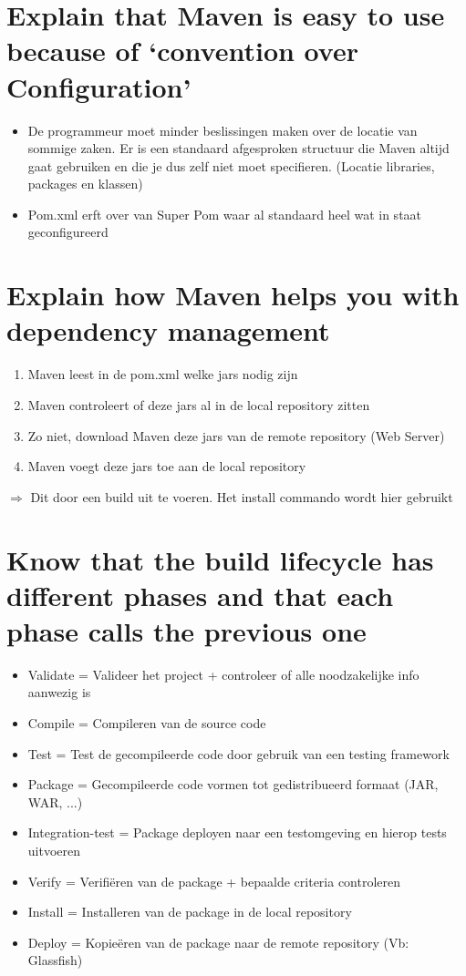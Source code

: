 \section{Explain that Maven is easy to use because of ‘convention over Configuration’}

\begin{itemize}
	\item De programmeur moet minder beslissingen maken over de locatie van sommige zaken. Er is een standaard afgesproken structuur die Maven altijd gaat gebruiken en die je dus zelf niet moet specifieren. (Locatie libraries, packages en klassen)
	\item Pom.xml erft over van Super Pom waar al standaard heel wat in staat geconfigureerd
\end{itemize}

\section{Explain how Maven helps you with dependency management}
\begin{enumerate}
	\item Maven leest in de pom.xml welke jars nodig zijn
	\item Maven controleert of deze jars al in de local repository zitten
	\item Zo niet, download Maven deze jars van de remote repository (Web Server)
	\item Maven voegt deze jars toe aan de local repository
\end{enumerate}

$\Rightarrow$ Dit door een build uit te voeren. Het install commando wordt hier gebruikt

\section{Know that the build lifecycle has different phases and that each phase calls the previous one}

\begin{itemize}
	\item Validate = Valideer het project + controleer of alle noodzakelijke info aanwezig is
	\item Compile = Compileren van de source code
		\item Test = Test de gecompileerde code door gebruik van een testing framework
	\item Package =  Gecompileerde code vormen tot gedistribueerd formaat (JAR, WAR, ...)
		\item Integration-test = Package deployen naar een testomgeving en hierop tests uitvoeren
	\item Verify = Verifiëren van de package + bepaalde criteria controleren
		\item Install = Installeren van de package in de local repository
	\item Deploy = Kopieëren van de package naar de remote repository (Vb: Glassfish)
\end{itemize}
	
